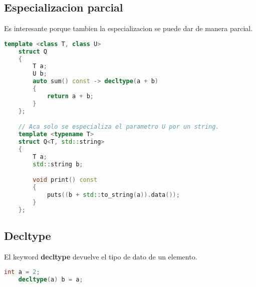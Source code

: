 \subsection{Especializacion parcial}
Es interesante porque tambien la especializacion se puede dar de manera parcial.
\begin{lstlisting}[language=C++, caption={'Especializacion parcial'}]
    template <class T, class U>
    struct Q
    {
        T a;
        U b;
        auto sum() const -> decltype(a + b)
        {
            return a + b;
        }
    };

    // Aca solo se especializa el parametro U por un string.
    template <typename T>
    struct Q<T, std::string>
    {
        T a;
        std::string b;

        void print() const
        {
            puts((b + std::to_string(a)).data());
        }
    };
\end{lstlisting}

\subsection{Decltype}
El keyword \textbf{decltype} devuelve el tipo de dato de un elemento.
\begin{lstlisting}[language=C++, caption={decltype}]
    int a = 2;
    decltype(a) b = a;
\end{lstlisting}


